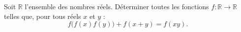 Soit $\mathbb{R}$ l'ensemble des nombres réels. Déterminer toutes les fonctions
$f : \mathbb{R} \to \mathbb{R}$ telles que, pour tous réels $x$ et $y$ :
\[
f\bigl(f(x)f(y)\bigr) + f(x+y) = f(xy).
\]
